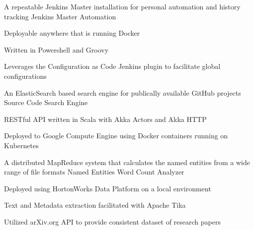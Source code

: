 
\begin{cventries}

  \cventry
    {A repeatable Jenkins Master installation for personal automation and history tracking} %
    {Jenkins Master Automation} %
    {} %
    {} %
    {
      \begin{cvitems} %
        \item {Deployable anywhere that is running Docker}
        \item {Written in Powershell and Groovy}
        \item {Leverages the Configuration as Code Jenkins plugin to facilitate global configurations}
      \end{cvitems}
    }

  \cventry
    {An ElasticSearch based search engine for publically available GitHub projects} %
    {Source Code Search Engine} %
    {} %
    {} %
    {
      \begin{cvitems} %
        \item {RESTful API written in Scala with Akka Actors and Akka HTTP}
        \item {Deployed to Google Compute Engine using Docker containers running on Kubernetes}
      \end{cvitems}
    }

  \cventry
    {A distributed MapReduce system that calculates the named entities from a wide range of file formats} %
    {Named Entities Word Count Analyzer} %
    {} %
    {} %
    {
      \begin{cvitems} %
        \item {Deployed using HortonWorks Data Platform on a local environment}
        \item {Text and Metadata extraction facilitated with Apache Tika}
        \item {Utilized arXiv.org API to provide consistent dataset of research papers}
      \end{cvitems}
    }


\end{cventries}
